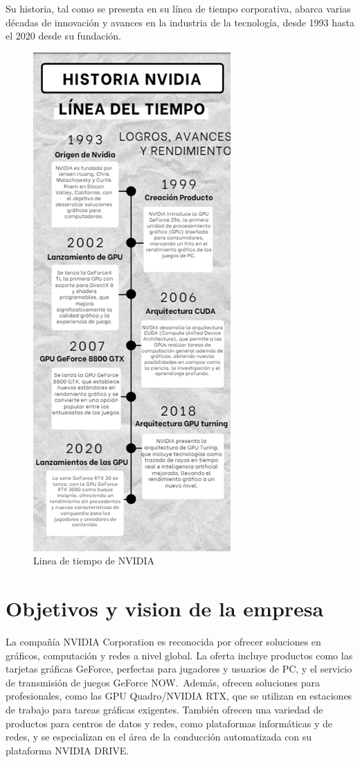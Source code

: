 \documentclass[twocolumn, 12pt]{article}
\begin{document}
Su historia, tal como se presenta en su línea de tiempo
corporativa, abarca varias décadas de innovación y avances
en la industria de la tecnología, desde 1993 hasta el 2020
desde su fundación.

\begin{figure}[H]
      \begin{center}
            \includegraphics[width=.5\linewidth]{./Images/LineaTiempo.png}
            \caption{Linea de tiempo de NVIDIA}
      \end{center}
\end{figure}

\section{Objetivos y vision de la empresa}

La compañía NVIDIA Corporation es reconocida por ofrecer soluciones
en gráficos, computación y redes a nivel global. La oferta incluye
productos como las tarjetas gráficas GeForce, perfectas para
jugadores y usuarios de PC, y el servicio de transmisión de
juegos GeForce NOW.~Además, ofrecen soluciones para
profesionales, como las GPU Quadro/NVIDIA RTX, que se
utilizan en estaciones de trabajo para tareas gráficas
exigentes. También ofrecen una variedad de productos
para centros de datos y redes, como plataformas
informáticas y de redes, y se especializan en el área
de la conducción automatizada con su plataforma NVIDIA DRIVE.\@{}
\end{document}
